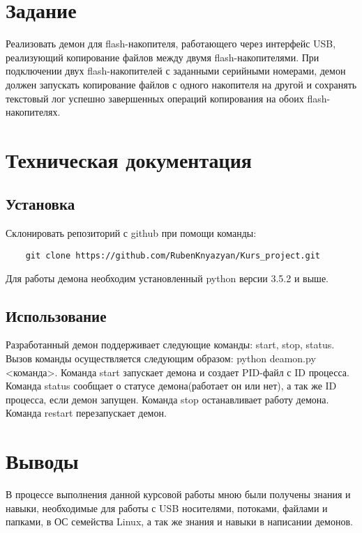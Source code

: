 \documentclass[12pt,a4paper]{scrartcl}
\begin{document}
\section{Задание}
	Реализовать демон для flash-накопителя, работающего через интерфейс USB, реализующий  копирование файлов между двумя flash-накопителями. При подключении двух flash-накопителей с заданными серийными номерами, демон должен запускать копирование файлов с одного накопителя на другой и сохранять текстовый лог успешно завершенных операций копирования на обоих flash-накопителях.
\section{Техническая документация}
\subsection{Установка}
	Склонировать репозиторий с github при помощи команды: \begin{verbatim}
	git clone https://github.com/RubenKnyazyan/Kurs_project.git
	\end{verbatim}Для работы демона необходим установленный python версии 3.5.2 и выше.
\subsection{Использование}
	Разработанный демон поддерживает следующие команды: start, stop, status. Вызов команды осуществляется следующим образом: python deamon.py <команда>. Команда start запускает демона и создает PID-файл с ID процесса. Команда status сообщает о статусе демона(работает он или нет), а так же ID процесса, если демон запущен. Команда stop останавливает работу демона.  Команда restart перезапускает демон. 

\section{Выводы}
	В процессе выполнения данной курсовой работы мною были получены знания и навыки, необходимые для работы с USB носителями, потоками, файлами и папками,  в ОС семейства Linux, а так же знания и навыки в написании демонов.
	\newpage
\end{document}
